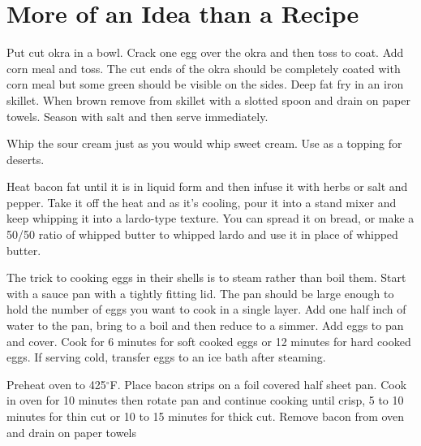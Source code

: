 \documentclass[letterpaper]{recipePMG}
\renewcommand{\deg}{$^\circ$}
\begin{document}
\chapter{  More of an Idea than a Recipe}



Put cut okra in a bowl. Crack one egg over the okra and then toss to coat. Add corn meal and toss.  The cut ends of the okra should be completely coated with corn meal but some green should be visible on the sides. Deep fat fry in an iron skillet. When brown remove from skillet with a slotted spoon and drain on paper towels. Season with salt and then serve immediately.



Whip the sour cream just as you would whip sweet cream.  Use as a topping for deserts.



Heat bacon fat until it is in liquid form and then infuse it with herbs or salt and pepper. Take it off the heat and as it's cooling, pour it into a stand mixer and keep whipping it into a lardo-type texture. You can spread it on bread, or make a 50/50 ratio of whipped butter to whipped lardo and use it in place of whipped butter.



The trick to cooking eggs in their shells is to steam rather than boil them. Start with a sauce pan with a tightly fitting lid. The pan should be large enough to hold the number of eggs you want to cook in a single layer.  Add one half inch of water to the pan, bring to a boil and then reduce to a simmer.  Add eggs to pan and cover.  Cook for 6 minutes for soft cooked eggs or 12 minutes for hard cooked eggs. If serving cold, transfer eggs to an ice bath after steaming.



Preheat oven to 425\deg F. Place bacon strips on a foil covered half sheet pan. Cook in oven for 10 minutes then rotate pan and continue cooking until crisp, 5 to 10 minutes for thin cut or 10 to 15 minutes for thick cut. Remove bacon from oven and drain on paper towels
\end{document}
